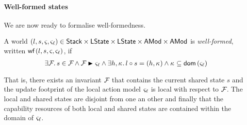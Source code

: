 \paragraph{Well-formed states}
We are now ready to formalise well-formedness.





\begin{definition}
A world $(l, s, \varsigma_{}, \varsigma_{\ell}) \in
\mathsf{Stack}\times\textsf{LState}\times\textsf{LState}\times\textsf{AMod}\times\textsf{AMod}$ is
\emph{well-formed}, written $\textsf{wf}\left( l, s, \varsigma_{}, \varsigma_{\ell} \right)$, if
\begin{align*}
  \exsts{\fence{}} 
  s \in \fence{} \land 
  \fence{} \strictfences \amod{\ell} \land
  \exsts{h,\ca{}}
  l \composeL s = (h,\ca{}) \land \ca{}\subseteq \dom{\amod{\ell}}
\end{align*}
\end{definition}


That is, there exists an invariant $\mathcal{F}_{}$ that contains the current shared state $s$ and the update footprint of the local action model $\varsigma_{\ell}$ is local with respect to $\mathcal{F}_{}$. The local and shared states are disjoint from one an other and finally that the capability resources of both local and shared states are contained within the domain of $\varsigma_{\ell}$.







